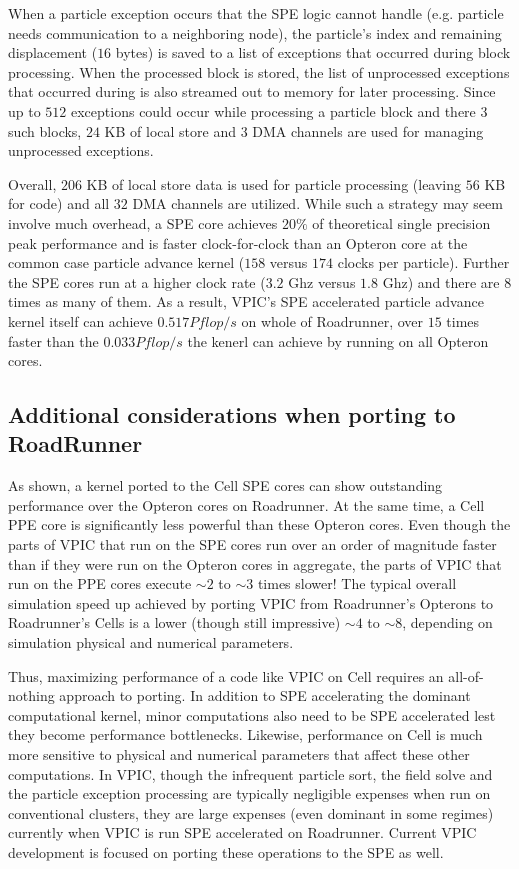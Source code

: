 \documentclass[letter,10pt]{article}
\begin{document}
When a particle exception occurs that the SPE logic cannot handle
(e.g. particle needs communication to a neighboring node), the
particle's index and remaining displacement ($16$ bytes) is saved to a
list of exceptions that occurred during block processing.  When the
processed block is stored, the list of unprocessed exceptions that
occurred during is also streamed out to memory for later processing.
Since up to $512$ exceptions could occur while processing a particle
block and there $3$ such blocks, $24$ KB of local store and $3$ DMA
channels are used for managing unprocessed exceptions.

Overall, $206$ KB of local store data is used for particle processing
(leaving $56$ KB for code) and all $32$ DMA channels are utilized.
While such a strategy may seem involve much overhead, a SPE core
achieves $20\%$ of theoretical single precision peak performance and
is faster clock-for-clock than an Opteron core at the common case
particle advance kernel ($158$ versus $174$ clocks per particle).
Further the SPE cores run at a higher clock rate ($3.2$ Ghz versus
$1.8$ Ghz) and there are $8$ times as many of them.  As a result,
VPIC's SPE accelerated particle advance kernel itself can achieve
$0.517 Pflop/s$ on whole of Roadrunner, over $15$ times faster than
the $0.033 Pflop/s$ the kenerl can achieve by running on all Opteron
cores.

\subsection{Additional considerations when porting to RoadRunner}

As shown, a kernel ported to the Cell SPE cores can show outstanding
performance over the Opteron cores on Roadrunner.  At the same time, a
Cell PPE core is significantly less powerful than these Opteron cores.
Even though the parts of VPIC that run on the SPE cores run over an
order of magnitude faster than if they were run on the Opteron cores
in aggregate, the parts of VPIC that run on the PPE cores execute
$\sim 2$ to $\sim 3$ times slower!  The typical overall simulation
speed up achieved by porting VPIC from Roadrunner's Opterons to
Roadrunner's Cells is a lower (though still impressive) $\sim 4$ to
$\sim 8$, depending on simulation physical and numerical parameters.

Thus, maximizing performance of a code like VPIC on Cell requires an
all-of-nothing approach to porting.  In addition to SPE accelerating
the dominant computational kernel, minor computations also need to be
SPE accelerated lest they become performance bottlenecks.  Likewise,
performance on Cell is much more sensitive to physical and numerical
parameters that affect these other computations.  In VPIC, though the
infrequent particle sort, the field solve and the particle exception
processing are typically negligible expenses when run on conventional
clusters, they are large expenses (even dominant in some regimes)
currently when VPIC is run SPE accelerated on Roadrunner.  Current
VPIC development is focused on porting these operations to the SPE as
well.
\end{document}
